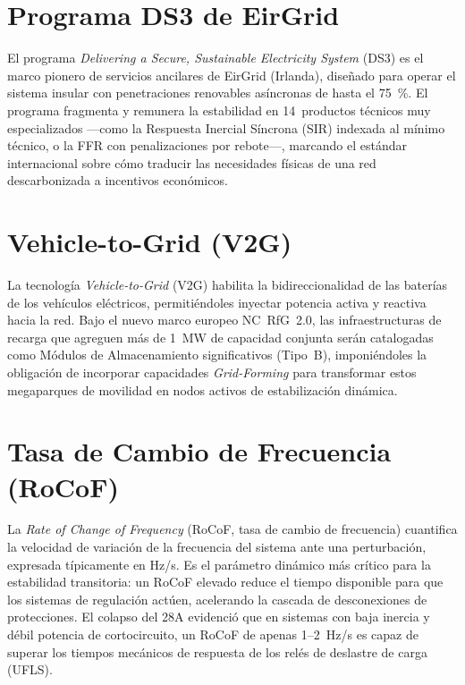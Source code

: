 \section{Programa DS3 de EirGrid}
\label{anexo:ds3}
El programa \textit{Delivering a Secure, Sustainable Electricity System}
(DS3) es el marco pionero de servicios ancilares de EirGrid (Irlanda),
diseñado para operar el sistema insular con penetraciones renovables
asíncronas de hasta el 75~\%. El programa fragmenta y remunera la
estabilidad en 14~productos técnicos muy especializados ---como la
Respuesta Inercial Síncrona (SIR) indexada al mínimo técnico, o la FFR
con penalizaciones por rebote---, marcando el estándar internacional sobre
cómo traducir las necesidades físicas de una red descarbonizada a
incentivos económicos.

\section{Vehicle-to-Grid (V2G)}
\label{anexo:v2g}
La tecnología \textit{Vehicle-to-Grid} (V2G) habilita la bidireccionalidad
de las baterías de los vehículos eléctricos, permitiéndoles inyectar
potencia activa y reactiva hacia la red. Bajo el nuevo marco europeo
NC~RfG~2.0, las infraestructuras de recarga que agreguen más de 1~MW de
capacidad conjunta serán catalogadas como Módulos de Almacenamiento
significativos (Tipo~B), imponiéndoles la obligación de incorporar
capacidades \textit{Grid-Forming} para transformar estos megaparques de
movilidad en nodos activos de estabilización dinámica.

\section{Tasa de Cambio de Frecuencia (RoCoF)}
\label{anexo:rocof}
La \textit{Rate of Change of Frequency} (RoCoF, tasa de cambio de
frecuencia) cuantifica la velocidad de variación de la frecuencia del
sistema ante una perturbación, expresada típicamente en Hz/s. Es el
parámetro dinámico más crítico para la estabilidad transitoria: un RoCoF
elevado reduce el tiempo disponible para que los sistemas de regulación
actúen, acelerando la cascada de desconexiones de protecciones. El
colapso del 28A evidenció que en sistemas con baja inercia y débil
potencia de cortocircuito, un RoCoF de apenas 1--2~Hz/s es capaz de
superar los tiempos mecánicos de respuesta de los relés de deslastre de
carga (UFLS).

